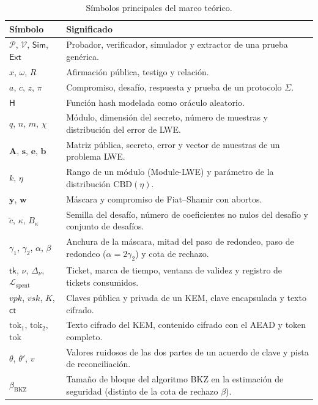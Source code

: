 \begin{table}[H]
\centering
\caption{Símbolos principales del marco teórico.}
\label{tab:notacion}
\small
\begin{tabularx}{\textwidth}{lY}
\toprule
\textbf{Símbolo} & \textbf{Significado} \\
\midrule
$\mathcal{P}$, $\mathcal{V}$, $\mathsf{Sim}$, $\mathsf{Ext}$ & Probador, verificador, simulador y extractor de una prueba genérica. \\
$x$, $\omega$, $R$ & Afirmación pública, testigo y relación. \\
$a$, $c$, $z$, $\pi$ & Compromiso, desafío, respuesta y prueba de un protocolo $\Sigma$. \\
$\mathsf{H}$ & Función hash modelada como oráculo aleatorio. \\
$q$, $n$, $m$, $\chi$ & Módulo, dimensión del secreto, número de muestras y distribución del error de LWE. \\
$\mathbf{A}$, $\mathbf{s}$, $\mathbf{e}$, $\mathbf{b}$ & Matriz pública, secreto, error y vector de muestras de un problema LWE. \\
$k$, $\eta$ & Rango de un módulo (Module-LWE) y parámetro de la distribución $\mathrm{CBD}(\eta)$. \\
$\mathbf{y}$, $\mathbf{w}$ & Máscara y compromiso de Fiat--Shamir con abortos. \\
$\tilde{c}$, $\kappa$, $B_\kappa$ & Semilla del desafío, número de coeficientes no nulos del desafío y conjunto de desafíos. \\
$\gamma_1$, $\gamma_2$, $\alpha$, $\beta$ & Anchura de la máscara, mitad del paso de redondeo, paso de redondeo ($\alpha = 2\gamma_2$) y cota de rechazo. \\
$\mathsf{tk}$, $\nu$, $\Delta_\nu$, $\mathcal{L}_{\text{spent}}$ & Ticket, marca de tiempo, ventana de validez y registro de tickets consumidos. \\
$vpk$, $vsk$, $K$, $\mathsf{ct}$ & Claves pública y privada de un KEM, clave encapsulada y texto cifrado. \\
$\text{tok}_1$, $\text{tok}_2$, $\text{tok}$ & Texto cifrado del KEM, contenido cifrado con el AEAD y token completo. \\
$\theta$, $\theta'$, $v$ & Valores ruidosos de las dos partes de un acuerdo de clave y pista de reconciliación. \\
$\beta_{\mathrm{BKZ}}$ & Tamaño de bloque del algoritmo BKZ en la estimación de seguridad (distinto de la cota de rechazo $\beta$). \\
\bottomrule
\end{tabularx}
\end{table}
